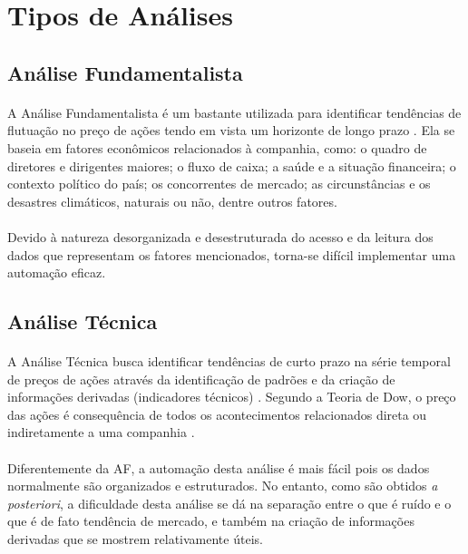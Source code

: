 \FloatBarrier
\section{Tipos de Análises}



\FloatBarrier
\subsection{Análise Fundamentalista}
\label{subsection:af}

\paragraph{} A Análise Fundamentalista é um bastante utilizada para identificar tendências de flutuação no preço de ações tendo em vista um horizonte de longo prazo \cite{bulkowski2012fundamental}. Ela se baseia em fatores econômicos relacionados à companhia, como: o quadro de diretores e dirigentes maiores; o fluxo de caixa; a saúde e a situação financeira; o contexto político do país; os concorrentes de mercado; as circunstâncias e os desastres climáticos, naturais ou não, dentre outros fatores.

\paragraph{} Devido à natureza desorganizada e desestruturada do acesso e da leitura dos dados que representam os fatores mencionados, torna-se difícil implementar uma automação eficaz.



\FloatBarrier
\subsection{Análise Técnica}
\label{subsection:at}

\paragraph{} A Análise Técnica busca identificar tendências de curto prazo na série temporal de preços de ações através da identificação de padrões e da criação de informações derivadas (indicadores técnicos) \cite{murphy1999technical, edwards2018technical}. Segundo a Teoria de Dow, o preço das ações é consequência de todos os acontecimentos relacionados direta ou indiretamente a uma companhia \cite{kirkpatrick2010technical}.

\paragraph{} Diferentemente da AF, a automação desta análise é mais fácil pois os dados normalmente são organizados e estruturados. No entanto, como são obtidos \textit{a posteriori}, a dificuldade desta análise se dá na separação entre o que é ruído e o que é de fato tendência de mercado, e também na criação de informações derivadas que se mostrem relativamente úteis.

